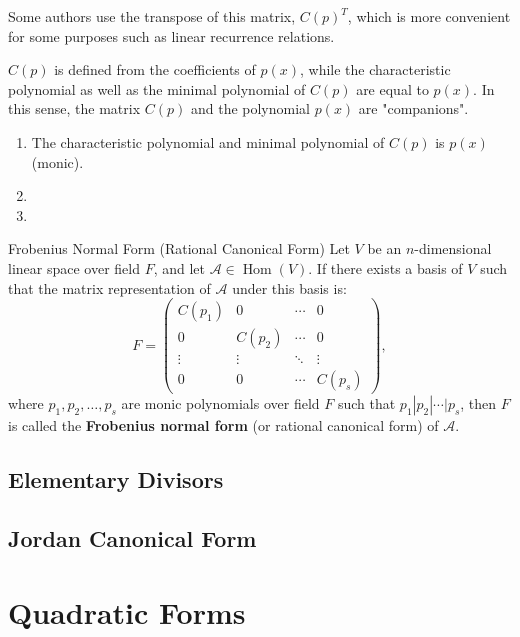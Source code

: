 \documentclass[11pt]{../../TexTemplate/elegantbook} %
\begin{document}
Some authors use the transpose of this matrix, \(C(p)^{T}\), 
which is more convenient for some purposes such as linear recurrence relations.

\(C(p)\) is defined from the coefficients of \(p(x)\), 
while the characteristic polynomial as well as the minimal polynomial of \(C(p)\) are equal to \(p(x)\). 
In this sense, the matrix \(C(p)\) and the polynomial \(p(x)\) are "companions".

\begin{property}
    \begin{enumerate}
        \item The characteristic polynomial and minimal polynomial of \( C(p) \) is \( p(x) \) (monic).
        \item  
        \item 
    \end{enumerate}
\end{property}

\begin{definition}{Frobenius Normal Form (Rational Canonical Form)}
    Let \( V \) be an \( n \)-dimensional linear space over field \( F \),
    and let \( \mathcal{A}\in \operatorname{Hom}(V) \).
    If there exists a basis of \( V \) such that the matrix representation of \( \mathcal{A} \) under this basis is:
    \[
    F = 
    \begin{pmatrix}
        C(p_1) & 0 & \cdots & 0 \\
        0 & C(p_2) & \cdots & 0 \\
        \vdots & \vdots & \ddots & \vdots \\
        0 & 0 & \cdots & C(p_s)
    \end{pmatrix},
    \]
    where \( p_1, p_2, \dots, p_s \) are monic polynomials over field \( F \) such that
    \( p_1 | p_2 | \cdots | p_s \),
    then \( F \) is called the \textbf{Frobenius normal form} (or rational canonical form) of \( \mathcal{A} \).
\end{definition}


\section{Elementary Divisors}

\section{Jordan Canonical Form}

\chapter{Quadratic Forms}
\end{document}
